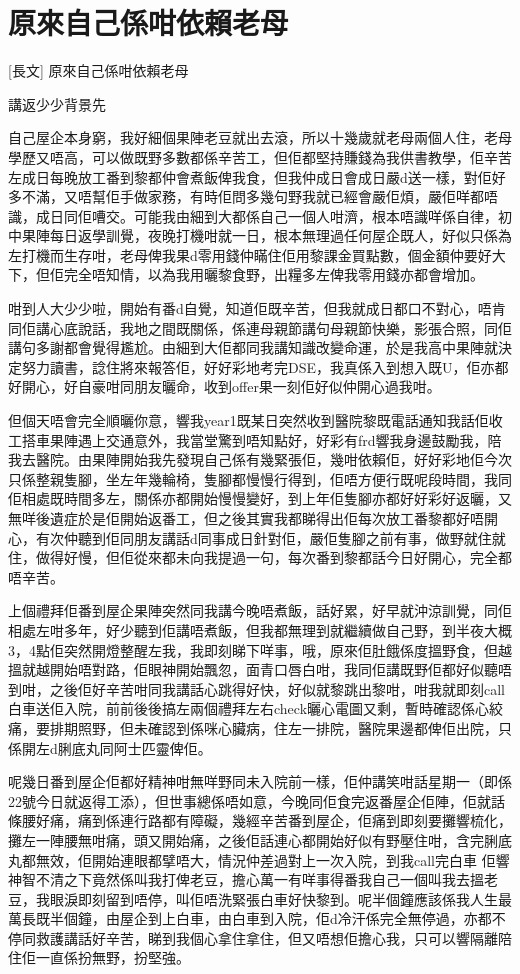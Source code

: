 \chapter{原來自己係咁依賴老母}

[長文] 原來自己係咁依賴老母

講返少少背景先

自己屋企本身窮，我好細個果陣老豆就出去滾，所以十幾歲就老母兩個人住，老母學歷又唔高，可以做既野多數都係辛苦工，但佢都堅持賺錢為我供書教學，佢辛苦左成日每晚放工番到黎都仲會煮飯俾我食，但我仲成日會成日嚴d送一樣，對佢好多不滿，又唔幫佢手做家務，有時佢問多幾句野我就已經會嚴佢煩，嚴佢咩都唔識，成日同佢嘈交。可能我由細到大都係自己一個人咁濟，根本唔識咩係自律，初中果陣每日返學訓覺，夜晚打機咁就一日，根本無理過任何屋企既人，好似只係為左打機而生存咁，老母俾我果d零用錢仲瞞住佢用黎課金買點數，個金額仲要好大下，但佢完全唔知情，以為我用曬黎食野，出糧多左俾我零用錢亦都會增加。

咁到人大少少啦，開始有番d自覺，知道佢既辛苦，但我就成日都口不對心，唔肯同佢講心底說話，我地之間既關係，係連母親節講句母親節快樂，影張合照，同佢講句多謝都會覺得尷尬。由細到大佢都同我講知識改變命運，於是我高中果陣就決定努力讀書，諗住將來報答佢，好好彩地考完DSE，我真係入到想入既U，佢亦都好開心，好自豪咁同朋友曬命，收到offer果一刻佢好似仲開心過我咁。

但個天唔會完全順曬你意，響我year1既某日突然收到醫院黎既電話通知我話佢收工搭車果陣遇上交通意外，我當堂驚到唔知點好，好彩有frd響我身邊鼓勵我，陪我去醫院。由果陣開始我先發現自己係有幾緊張佢，幾咁依賴佢，好好彩地佢今次只係整親隻腳，坐左年幾輪椅，隻腳都慢慢行得到，佢唔方便行既呢段時間，我同佢相處既時間多左，關係亦都開始慢慢變好，到上年佢隻腳亦都好好彩好返曬，又無咩後遺症於是佢開始返番工，但之後其實我都睇得出佢每次放工番黎都好唔開心，有次仲聽到佢同朋友講話d同事成日針對佢，嚴佢隻腳之前有事，做野就住就住，做得好慢，但佢從來都未向我提過一句，每次番到黎都話今日好開心，完全都唔辛苦。

上個禮拜佢番到屋企果陣突然同我講今晚唔煮飯，話好累，好早就沖涼訓覺，同佢相處左咁多年，好少聽到佢講唔煮飯，但我都無理到就繼續做自己野，到半夜大概3，4點佢突然開燈整醒左我，我即刻睇下咩事，哦，原來佢肚餓係度搵野食，但越搵就越開始唔對路，佢眼神開始飄忽，面青口唇白咁，我同佢講既野佢都好似聽唔到咁，之後佢好辛苦咁同我講話心跳得好快，好似就黎跳出黎咁，咁我就即刻call白車送佢入院，前前後後搞左兩個禮拜左右check曬心電圖又剩，暫時確認係心絞痛，要排期照野，但未確認到係咪心臟病，住左一排院，醫院果邊都俾佢出院，只係開左d脷底丸同阿士匹靈俾佢。

呢幾日番到屋企佢都好精神咁無咩野同未入院前一樣，佢仲講笑咁話星期一（即係22號今日就返得工添），但世事總係唔如意，今晚同佢食完返番屋企佢陣，佢就話條腰好痛，痛到係連行路都有障礙，幾經辛苦番到屋企，佢痛到即刻要攤響梳化，攤左一陣腰無咁痛，頭又開始痛，之後佢話連心都開始好似有野壓住咁，含完脷底丸都無效，佢開始連眼都擘唔大，情況仲差過對上一次入院，到我call完白車 佢響神智不清之下竟然係叫我打俾老豆，擔心萬一有咩事得番我自己一個叫我去搵老豆，我眼淚即刻留到唔停，叫佢唔洗緊張白車好快黎到。呢半個鐘應該係我人生最萬長既半個鐘，由屋企到上白車，由白車到入院，佢d冷汗係完全無停過，亦都不停同救護講話好辛苦，睇到我個心拿住拿住，但又唔想佢擔心我，只可以響隔離陪住佢一直係扮無野，扮堅強。

